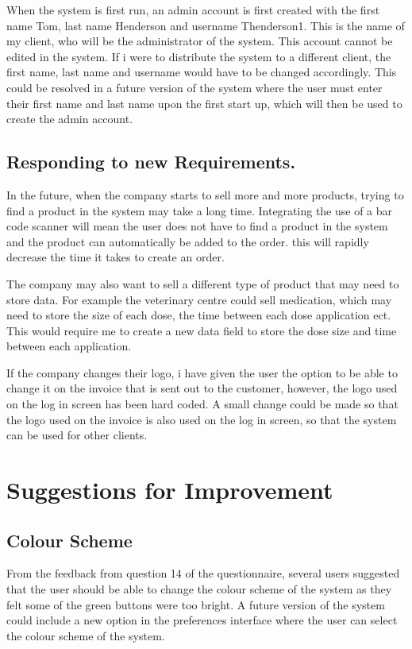 When the system is first run, an admin account is first created with the first name Tom, last name Henderson and username Thenderson1. This is the name of my client, who will be the administrator of the system. This account cannot be edited in the system. If i were to distribute the system to a different client, the first name, last name and username would have to be changed accordingly. This could be resolved in a future version of the system where the user must enter their first name and last name upon the first start up, which will then be used to create the admin account.

\subsection{Responding to new Requirements.}

In the future, when the company starts to sell more and more products, trying to find a product in the system may take a long time. Integrating the use of a bar code scanner will mean the user does not have to find a product in the system and the product can automatically be added to the order. this will rapidly decrease the time it takes to create an order.

The company may also want to sell a different type of product that may need to store data. For example the veterinary centre could sell medication, which may need to store the size of each dose, the time between each dose application ect. This would require me to create a new data field to store the dose size and time between each application.

If the company changes their logo, i have given the user the option to be able to change it on the invoice that is sent out to the customer, however, the logo used on the log in screen has been hard coded. A small change could be made so that the logo used on the invoice is also used on the log in screen, so that the system can be used for other clients.

\pagebreak
\section{Suggestions for Improvement}

\subsection{Colour Scheme}
From the feedback from question 14 of the questionnaire, several users suggested that the user should be able to change the colour scheme of the system as they felt some of the green buttons were too bright. A future version of the system could include a new option in the preferences interface where the user can select the colour scheme of the system. 

